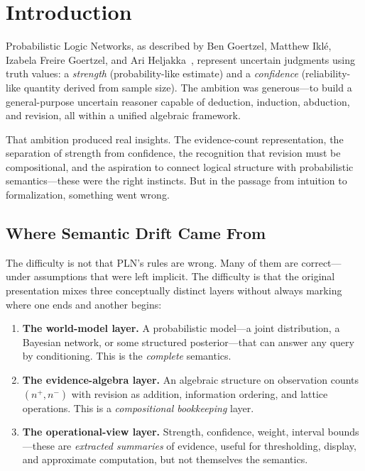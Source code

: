 \documentclass[11pt,openany]{report}
\begin{document}
\chapter{Introduction}
\label{ch:introduction}

Probabilistic Logic Networks, as described by Ben Goertzel, Matthew Ikl\'{e},
Izabela Freire Goertzel, and Ari Heljakka~\cite{goertzel2009pln}, represent uncertain judgments using truth
values: a \emph{strength} (probability-like estimate) and a \emph{confidence}
(reliability-like quantity derived from sample size).  The ambition was
generous---to build a general-purpose uncertain reasoner capable of deduction,
induction, abduction, and revision, all within a unified algebraic framework.

That ambition produced real insights.  The evidence-count representation, the
separation of strength from confidence, the recognition that revision must be
compositional, and the aspiration to connect logical structure with
probabilistic semantics---these were the right instincts.  But in the passage
from intuition to formalization, something went wrong.

\section{Where Semantic Drift Came From}

The difficulty is not that PLN's rules are wrong.  Many of them are
correct---under assumptions that were left implicit.  The difficulty is that
the original presentation mixes three conceptually distinct layers without
always marking where one ends and another begins:

\begin{enumerate}
\item \textbf{The world-model layer.}  A probabilistic model---a joint
  distribution, a Bayesian network, or some structured posterior---that can
  answer any query by conditioning.  This is the \emph{complete} semantics.

\item \textbf{The evidence-algebra layer.}  An algebraic structure on
  observation counts $(n^+, n^-)$ with revision as addition, information
  ordering, and lattice operations.  This is a \emph{compositional bookkeeping}
  layer.

\item \textbf{The operational-view layer.}  Strength, confidence, weight,
  interval bounds---these are \emph{extracted summaries} of evidence, useful for
  thresholding, display, and approximate computation, but not themselves the
  semantics.
\end{enumerate}
\end{document}
